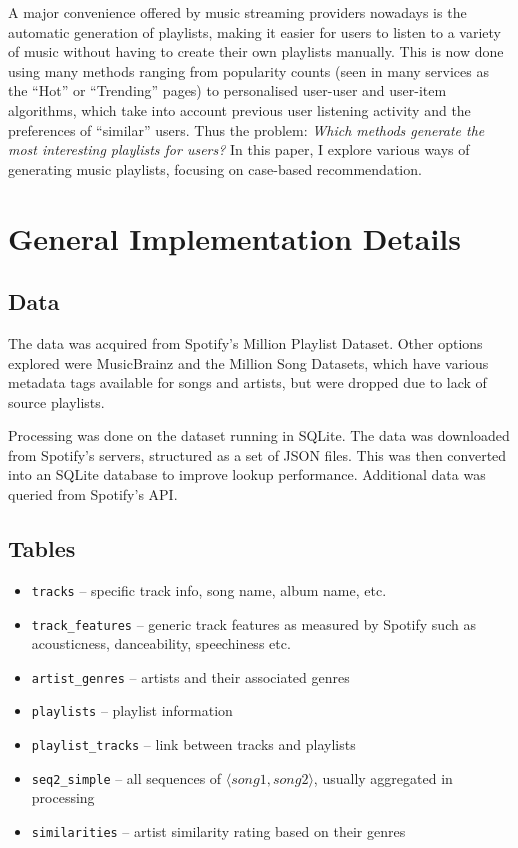 \documentclass[a4paper, 12pt]{report}
\begin{document}
A major convenience offered by music streaming providers nowadays is the automatic generation of playlists,
making it easier for users to listen to a variety of music without having to create their own playlists manually.
This is now done using many methods ranging from popularity counts (seen in many services as the ``Hot'' or ``Trending'' pages) to personalised user-user and user-item algorithms,
which take into account previous user listening activity and the preferences of ``similar'' users. Thus the problem: \textit{Which
methods generate the most interesting playlists for users?} In this paper, I explore various ways of generating music playlists, focusing on case-based recommendation.




\chapter{General Implementation Details}

\section{Data}
The data was acquired from Spotify's Million Playlist Dataset. Other options explored were MusicBrainz and the Million Song Datasets,
which have various metadata tags available for songs and artists, but were dropped due to lack of source playlists.

Processing was done on the dataset running in SQLite.
The data was downloaded from Spotify's servers, structured as a set of JSON files.
This was then converted into an SQLite database to improve lookup performance.
Additional data was queried from Spotify's API.

\section{Tables}
\begin{itemize}
    \item \texttt{tracks} -- specific track info, song name, album name, etc.
    \item \texttt{track\_features} -- generic track features as measured by Spotify such as acousticness, danceability, speechiness etc.
    \item \texttt{artist\_genres} -- artists and their associated genres
    \item \texttt{playlists} -- playlist information
    \item \texttt{playlist\_tracks} -- link between tracks and playlists
    \item \texttt{seq2\_simple} -- all sequences of \(\langle song1, song2 \rangle\), usually aggregated in processing
    \item \texttt{similarities} -- artist similarity rating based on their genres
\end{itemize}
\end{document}
